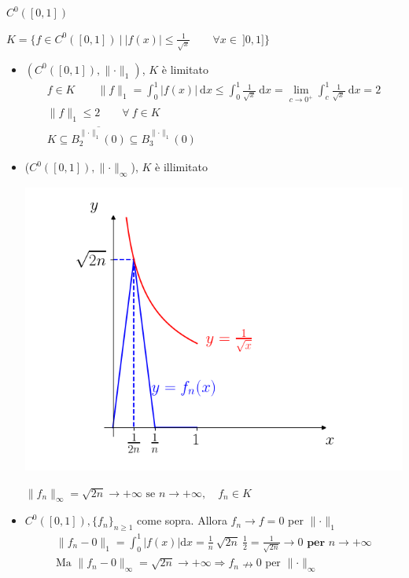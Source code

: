 \begin{exbar}
\begin{example}
	$C^0 ([0,1])$
	
	$K = \{ f \in C^0 ([0,1]) \ \big| \ |f(x)| \leq \frac{1}{\sqrt{x}} \qquad \forall x \in \ ]0,1] \}$
	\begin{itemize}
		\item $(C^0 ([0,1]), \parallel \cdot \parallel_1)$, $K$ è limitato 
		\begin{gather*}
			f \in K \qquad \parallel f \parallel_1 = \int_{0}^{1} |f(x)| \ \mathrm{d}x \leq \int_{0}^{1} \frac{1}{\sqrt{x}} \ \mathrm{d}x = \lim_{c \rightarrow 0^+} \int_{c}^{1} \frac{1}{\sqrt{x}} \ \mathrm{d}x = 2
			\\
			\parallel f \parallel_1 \leq 2 \qquad \forall \ f \in K
			\\
			K \subseteq \overline{B_{2}^{\parallel \cdot \parallel_1}(0)} \subseteq B_{3}^{\parallel \cdot \parallel_1}(0)
		\end{gather*}

		\item ($C^0 ([0,1]), \parallel \cdot \parallel_\infty$), $K$ è illimitato
		
		\begin{center}
			\includegraphics[width=0.7\linewidth]{spazi_metrici_e_normati/pag165}
			\label{fig:pag165}
		\end{center}
		
		$\parallel f_n \parallel_\infty = \sqrt{2n} \rightarrow +\infty \text{ se } n \rightarrow +\infty, \quad f_n \in K$
		
		\item $C^0 ([0,1]), \{ f_n \}_{n \geq 1}$ come sopra. Allora $f_n \rightarrow f = 0$ per $\parallel \cdot \parallel_1$
		\begin{gather*}
			\parallel f_n - 0 \parallel_1 =\int_{0}^{1} |f(x)| \mathrm{d}x = \frac{1}{n} \ \sqrt{2n} \ \frac{1}{2} = \frac{1}{\sqrt{2n}} \rightarrow 0 \textbf{ per } n \rightarrow +\infty
			\\
			\text{Ma } \parallel f_n - 0 \parallel_\infty = \sqrt{2n} \rightarrow +\infty \Rightarrow f_n \nrightarrow 0 \text{ per } \parallel \cdot \parallel_\infty
		\end{gather*}
	\end{itemize}
\end{example}
\end{exbar}


